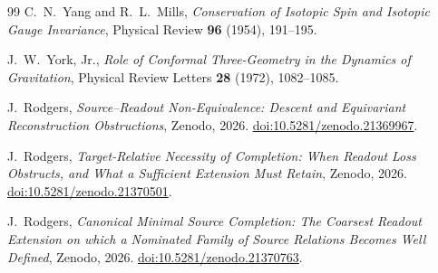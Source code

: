 \documentclass[11pt,a4paper]{article}
\theoremstyle{plain}
\theoremstyle{definition}
\theoremstyle{remark}
\begin{document}
\begin{thebibliography}{99}
C.~N.~Yang and R.~L.~Mills,
\emph{Conservation of Isotopic Spin and Isotopic Gauge Invariance},
Physical Review \textbf{96} (1954), 191--195.

J.~W.~York, Jr.,
\emph{Role of Conformal Three-Geometry in the Dynamics of Gravitation},
Physical Review Letters \textbf{28} (1972), 1082--1085.

J.~Rodgers,
\emph{Source--Readout Non-Equivalence: Descent and Equivariant Reconstruction Obstructions},
Zenodo, 2026.
\href{https://doi.org/10.5281/zenodo.21369967}{doi:10.5281/zenodo.21369967}.

J.~Rodgers,
\emph{Target-Relative Necessity of Completion: When Readout Loss Obstructs, and What a Sufficient
Extension Must Retain},
Zenodo, 2026.
\href{https://doi.org/10.5281/zenodo.21370501}{doi:10.5281/zenodo.21370501}.

J.~Rodgers,
\emph{Canonical Minimal Source Completion: The Coarsest Readout Extension on which a Nominated
Family of Source Relations Becomes Well Defined},
Zenodo, 2026.
\href{https://doi.org/10.5281/zenodo.21370763}{doi:10.5281/zenodo.21370763}.

\end{thebibliography}
\end{document}
